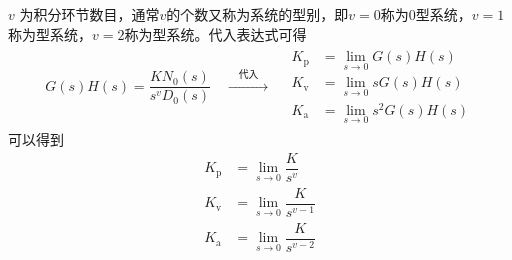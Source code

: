 $v$ 为积分环节数目，通常$v$的个数又称为系统的型别，即$v = 0$称为0型系统，$v = 1$称为\RMN[1]型系统，$v = 2$称为\RMN[2]型系统。代入表达式可得
\begin{align*}
	G(s)H(s) =  \dfrac{KN_0(s)}{s^vD_0(s)}
	\quad
	\xrightarrow{\quad\mbox{代入} \quad }
	\quad 
	\begin{aligned}
		K_{\text{p}} &= \lim\limits_{s \to 0} G(s)H(s)\\
		K_{\text{v}} &= \lim\limits_{s \to 0}s G(s)H(s)\\
		K_{\text{a}} &= \lim\limits_{s \to 0}s^2 G(s)H(s)
	\end{aligned}
\end{align*}
可以得到
\begin{align}
	K_{\text{p}} &= \lim\limits_{s \to 0} \dfrac{K}{s^v}\\[0.5em]
	K_{\text{v}} &= \lim\limits_{s \to 0} \dfrac{K}{s^{v-1}}\\[0.5em]
	K_{\text{a}} &= \lim\limits_{s \to 0} \dfrac{K}{s^{v-2}}
\end{align}

